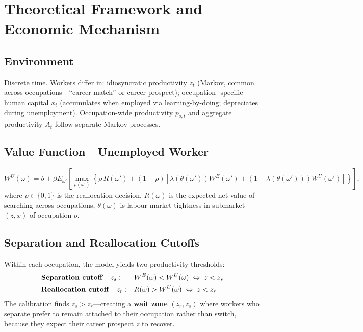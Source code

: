 \section{Theoretical Framework and Economic Mechanism}

\subsection*{Environment}

Discrete time. Workers differ in: idiosyncratic productivity $z_t$ (Markov,
common across occupations---``career match'' or career prospect); occupation-
specific human capital $x_t$ (accumulates when employed via learning-by-doing;
depreciates during unemployment). Occupation-wide productivity $p_{o,t}$ and
aggregate productivity $A_t$ follow separate Markov processes.

\subsection*{Value Function---Unemployed Worker}

\begin{equation}
  W^U(\omega) = b + \beta E_{\omega'}\!\left[\max_{\rho(\omega')}\!
    \left\{\rho\,R(\omega') + (1-\rho)\!\left[\lambda(\theta(\omega'))W^E(\omega')
    + (1-\lambda(\theta(\omega')))W^U(\omega')\right]\right\}\right],
  \label{eq:ct_wu}
\end{equation}
where $\rho\in\{0,1\}$ is the reallocation decision, $R(\omega)$ is the
expected net value of searching across occupations, $\theta(\omega)$ is labour
market tightness in submarket $(z,x)$ of occupation $o$.

\subsection*{Separation and Reallocation Cutoffs}

Within each occupation, the model yields two productivity thresholds:
\begin{align}
  &\text{\textbf{Separation cutoff}} \quad z_s:
    &&W^E(\omega) < W^U(\omega) \;\Leftrightarrow\; z < z_s \\
  &\text{\textbf{Reallocation cutoff}} \quad z_r:
    &&R(\omega) > W^U(\omega) \;\Leftrightarrow\; z < z_r
\end{align}
The calibration finds $z_s > z_r$---creating a \textbf{wait zone}
$(z_r, z_s)$ where workers who separate prefer to remain attached to their
occupation rather than switch, because they expect their career prospect $z$
to recover.

